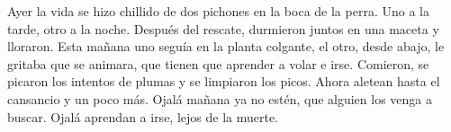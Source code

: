 
Ayer la vida se hizo chillido de dos pichones en la boca de la perra.
Uno a la tarde, otro a la noche. Después del rescate, durmieron juntos
en una maceta y lloraron. Esta mañana uno seguía en la planta colgante,
el otro, desde abajo, le gritaba que se animara, que tienen que aprender
a volar e irse. Comieron, se picaron los intentos de plumas y se
limpiaron los picos. Ahora aletean hasta el cansancio y un poco más.
Ojalá mañana ya no estén, que alguien los venga a buscar. Ojalá aprendan
a irse, lejos de la muerte.


